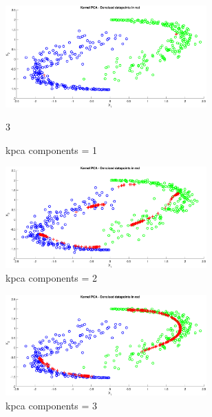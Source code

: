 \begin{figure}[ht]
	\centering
	\begin{subfigure}[b]{0.32\textwidth}
		\centering
		\includegraphics[width = 0.85\textwidth]{Exercise3/Report/pca_nc_1}
		\caption{kpca components = 1 }\label{fig:pca_nc_1}3
	\end{subfigure}%
	\begin{subfigure}[b]{0.32\textwidth}
		\centering
		\includegraphics[width = 0.85\textwidth]{Exercise3/Report/pca_nc_2}
		\caption{kpca components = 2}\label{fig:pca_nc_2}
	\end{subfigure}%
	\begin{subfigure}[b]{0.32\textwidth}
		\centering
		\includegraphics[width = 0.85\textwidth]{Exercise3/Report/pca_nc_3}
		\caption{kpca components = 3 }\label{fig:pca_nc_3}
	\end{subfigure}
	\begin{subfigure}[b]{0.32\textwidth}

\end{subfigure}
\end{figure}
